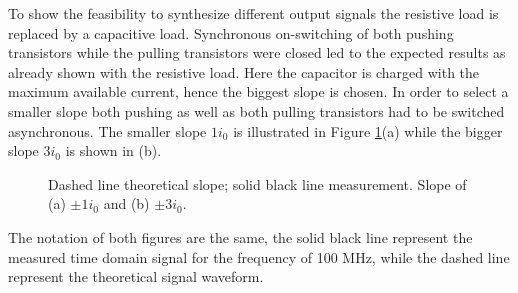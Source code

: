 \documentclass[journal]{IEEEtran}
\begin{document}
To show the feasibility to synthesize different output signals the resistive load is replaced by a capacitive load.
Synchronous on-switching of both pushing transistors while the pulling transistors were closed led to the expected results as already shown with the resistive load.
Here the capacitor is charged with the maximum available current, hence the biggest slope is chosen.
In order to select a smaller slope both pushing as well as both pulling transistors had to be switched asynchronous.
The smaller slope $1 i_0$ is illustrated in Figure \ref{fig:meas_Output_CLoad_100M_1io_3io}(a) while the bigger slope $3 i_0$ is shown in (b).
%
\begin{figure}[htb]
  \centering
	\begin{scriptsize}
  	\def\svgwidth{\columnwidth}
 	 
  	\caption{Dashed line theoretical slope; solid black line measurement. Slope of (a) $\pm 1  i_0$ and (b) $\pm 3 i_0$.}
  	\label{fig:meas_Output_CLoad_100M_1io_3io}
	\end{scriptsize}
\end{figure}

The notation of both figures are the same, the solid black line represent the measured time domain signal for the frequency of 100 MHz, while the dashed line represent the theoretical signal waveform.

\end{document}
